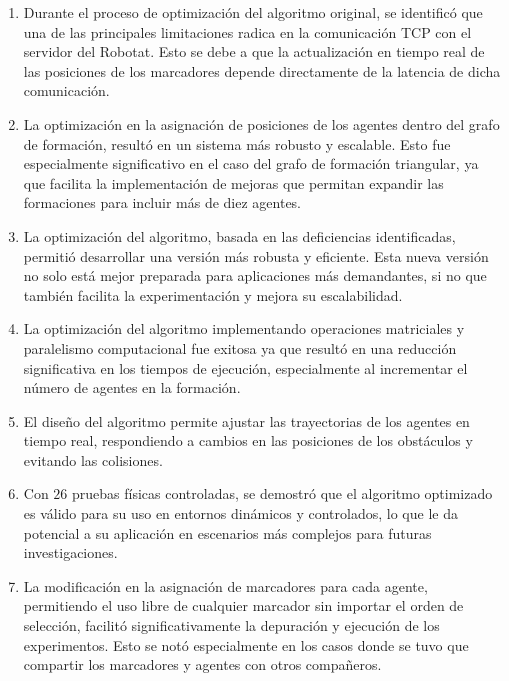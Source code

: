 \begin{enumerate}
	\item Durante el proceso de optimización del algoritmo original, se identificó que una de las principales limitaciones radica en la comunicación TCP con el servidor del Robotat. Esto se debe a que la actualización en tiempo real de las posiciones de los marcadores depende directamente de la latencia de dicha comunicación.
	\item La optimización en la asignación de posiciones de los agentes dentro del grafo de formación, resultó en un sistema más robusto y escalable. Esto fue especialmente significativo en el caso del grafo de formación triangular, ya que facilita la implementación de mejoras que permitan expandir las formaciones para incluir más de diez agentes.
	\item La optimización del algoritmo, basada en las deficiencias identificadas, permitió desarrollar una versión más robusta y eficiente. Esta nueva versión no solo está mejor preparada para aplicaciones más demandantes, si no que también facilita la experimentación y mejora su escalabilidad.
	\item La optimización del algoritmo implementando operaciones matriciales y paralelismo computacional fue exitosa ya que resultó en una reducción significativa en los tiempos de ejecución, especialmente al incrementar el número de agentes en la formación.
	\item El diseño del algoritmo permite ajustar las trayectorias de los agentes en tiempo real, respondiendo a cambios en las posiciones de los obstáculos y evitando las colisiones.
	\item Con $26$ pruebas físicas controladas, se demostró que el algoritmo optimizado es válido para su uso en entornos dinámicos y controlados, lo que le da potencial a su aplicación en escenarios más complejos para futuras investigaciones.
	\item La modificación en la asignación de marcadores para cada agente, permitiendo el uso libre de cualquier marcador sin importar el orden de selección, facilitó significativamente la depuración y ejecución de los experimentos. Esto se notó especialmente en los casos donde se tuvo que compartir los marcadores y agentes con otros compañeros.
\end{enumerate}